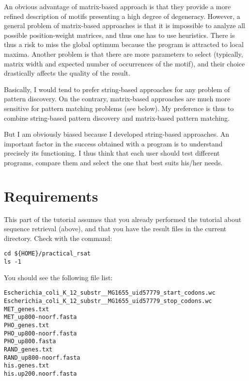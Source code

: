 An obvious advantage of matrix-based approach is that they provide a
more refined description of motifs presenting a high degree of
degeneracy. However, a general problem of matrix-based approaches is
that it is impossible to analyze all possible position-weight
matrices, and thus one has to use heuristics. There is thus a risk to
miss the global optimum because the program is attracted to local
maxima. Another problem is that there are more parameters to select
(typically, matrix width and expected number of occurrences of the
motif), and their choice drastically affects the quality of the
result.

Basically, I would tend to prefer string-based approaches for any
problem of pattern discovery. On the contrary, matrix-based approaches
are much more sensitive for pattern matching problems (see below). My
preference is thus to combine string-based pattern discovery and
matrix-based pattern matching.

But I am obviously biased because I developed string-based
approaches. An important factor in the success obtained with a program
is to understand precisely its functioning. I thus think that each
user should test different programs, compare them and select the one
that best suits his/her needs.

\section{Requirements}

This part of the tutorial assumes that you already performed the
tutorial about sequence retrieval (above), and that you have the
result files in the current directory. Check with the command:

{\color{Blue} \begin{footnotesize} 
\begin{verbatim}
cd ${HOME}/practical_rsat
ls -1
\end{verbatim} \end{footnotesize}
}


You should see the following file list:
{\color{OliveGreen} \begin{footnotesize} 
\begin{verbatim}
Escherichia_coli_K_12_substr__MG1655_uid57779_start_codons.wc
Escherichia_coli_K_12_substr__MG1655_uid57779_stop_codons.wc
MET_genes.txt
MET_up800-noorf.fasta
PHO_genes.txt
PHO_up800-noorf.fasta
PHO_up800.fasta
RAND_genes.txt
RAND_up800-noorf.fasta
his.genes.txt
his.up200.noorf.fasta
\end{verbatim} \end{footnotesize}
}

